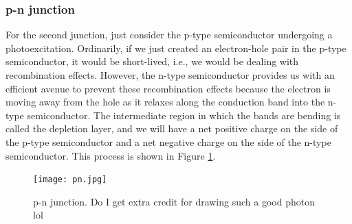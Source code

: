 \documentclass[12pt]{article}
\begin{document}
\subsubsection{p-n junction}
For the second junction, just consider the p-type semiconductor undergoing a photoexcitation. Ordinarily, if we just created an electron-hole pair in the p-type semiconductor, it would be short-lived, i.e., we would be dealing with recombination effects. However, the n-type semiconductor provides us with an efficient avenue to prevent these recombination effects because the electron is moving away from the hole as it relaxes along the conduction band into the n-type semiconductor. The intermediate region in which the bands are bending is called the depletion layer, and we will have a net positive charge on the side of the p-type semiconductor and a net negative charge on the side of the n-type semiconductor. This process is shown in Figure \ref{fig:pn}.
\begin{figure}[h]
\centering
\texttt{[image: pn.jpg]}
\caption{p-n junction. Do I get extra credit for drawing such a good photon lol}
\label{fig:pn}
\end{figure}
\end{document}
